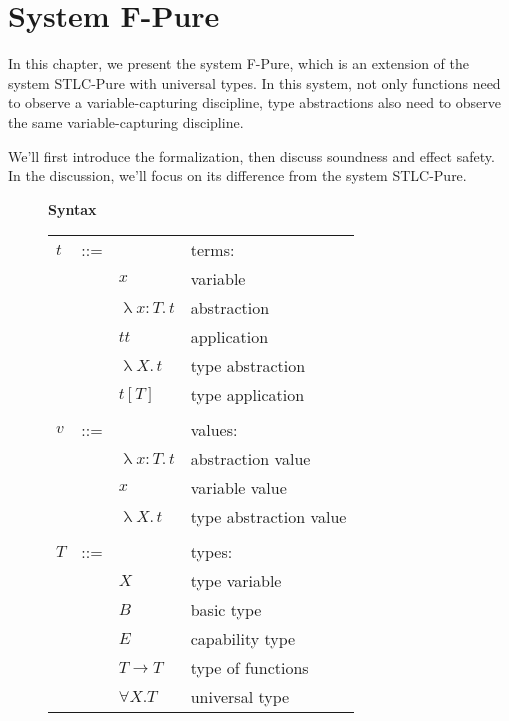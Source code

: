 \section{System F-Pure}

In this chapter, we present the system F-Pure, which is an extension
of the system STLC-Pure with universal types. In this system, not only
functions need to observe a variable-capturing discipline, type
abstractions also need to observe the same variable-capturing
discipline.

We'll first introduce the formalization, then discuss soundness and
effect safety. In the discussion, we'll focus on its difference from
the system STLC-Pure.

\begin{figure}
\begin{framed}

\setlength{\columnseprule}{0.4pt}
\begin{multicols}{2}

\textbf{Syntax}

\begin{tabu} to \linewidth {l l l X[r]}
  $t$ & ::= &                                      & terms:               \\
      &     & $x$                                  & variable             \\
      &     & $\uplambda x{:}T.\, t$               & abstraction          \\
      &     & $t t$                                & application          \\
      &     & \colorbox{shade}{$\uplambda X.\, t$} & type abstraction     \\
      &     & \colorbox{shade}{$t [T]$}            & type application     \\
\\
  $v$ & ::= &                    & values:              \\
      &     & $\uplambda x{:}T.\, t$ & abstraction value    \\
      &     & $x$                & variable value       \\
      &     & \colorbox{shade}{$\uplambda X.\, t$}    & type abstraction value  \\
\\
  $T$ & ::= &                         & types:               \\
      &     & \colorbox{shade}{$X$}   & type variable        \\
      &     & $B$                     & basic type           \\
      &     & $E$                     & capability type      \\
      &     & $T \to T$              & type of functions    \\
      &     & \colorbox{shade}{$\forall X. T$} & universal type       \\
\end{tabu}


\end{multicols}
\end{framed}
\end{figure}
